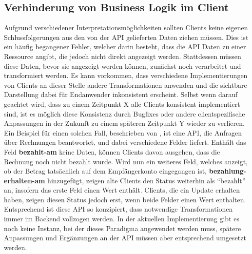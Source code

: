 \subsection{Verhinderung von Business Logik im Client}\label{subsec:api_client_no_business_logic}
Aufgrund verschiedener Interpretationsmöglichkeiten sollten Clients keine eigenen Schlussfolgerungen aus den von der API gelieferten Daten ziehen müssen. Dies ist ein häufig begangener Fehler, welcher darin besteht, dass die API Daten zu einer Ressource angibt, die jedoch nicht direkt angezeigt werden. Stattdessen müssen diese Daten, bevor sie angezeigt werden können, zunächst noch verarbeitet und transformiert werden. Es kann vorkommen, dass verschiedene Implementierungen von Clients an dieser Stelle andere Transformationen anwenden und die sichtbare Darstellung dabei für Endanwender inkonsistent erscheint. Selbst wenn darauf geachtet wird, dass zu einem Zeitpunkt X alle Clients konsistent implementiert sind, ist es möglich diese Konsistenz durch Bugfixes oder andere clientspezifische Anpassungen in der Zukunft zu einem späteren Zeitpunkt Y wieder zu verlieren. Ein Beispiel für einen solchen Fall, beschrieben von  \parencite*[vgl.][]{sturgeon_2017}, ist eine API, die Anfragen über Rechnungen beantwortet, und dabei verschiedene Felder liefert. Enthält das Feld \textbf{bezahlt-am} keine Daten, können Clients davon ausgehen, dass die Rechnung noch nicht bezahlt wurde. Wird nun ein weiteres Feld, welches anzeigt, ob der Betrag tatsächlich auf dem Empfängerkonto eingegangen ist, \textbf{bezahlung-erhalten-am} hinzugefügt, zeigen alte Clients den Status weiterhin als \enquote{bezahlt} an, insofern das erste Feld einen Wert enthält. Clients, die ein Update erhalten haben, zeigen diesen Status jedoch erst, wenn beide Felder einen Wert enthalten.
Entsprechend ist diese API so konzipiert, dass notwendige Transformationen immer im Backend vollzogen werden. In der aktuellen Implementierung gibt es noch keine Instanz, bei der dieses Paradigma angewendet werden muss, spätere Anpassungen und Ergänzungen an der API müssen aber entsprechend umgesetzt werden.
